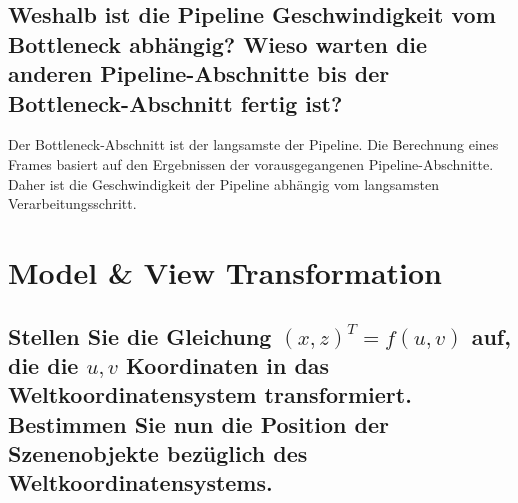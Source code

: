 \documentclass[a4paper,10pt,DIV=14]{scrartcl}
\begin{document}
\subsection{Weshalb ist die Pipeline Geschwindigkeit vom Bottleneck abhängig? Wieso warten die anderen Pipeline-Abschnitte bis der Bottleneck-Abschnitt fertig ist?}
Der Bottleneck-Abschnitt ist der langsamste der Pipeline. Die Berechnung eines Frames basiert auf den Ergebnissen der vorausgegangenen Pipeline-Abschnitte. Daher ist die Geschwindigkeit der Pipeline abhängig vom langsamsten Verarbeitungsschritt.


\section{Model \& View Transformation}

%
%

\subsection{Stellen Sie die Gleichung $(x, z)^T = f(u,v)$ auf, die die $u, v$ Koordinaten in das Weltkoordinatensystem transformiert. Bestimmen Sie nun die Position der Szenenobjekte bezüglich des Weltkoordinatensystems.}
\end{document}
